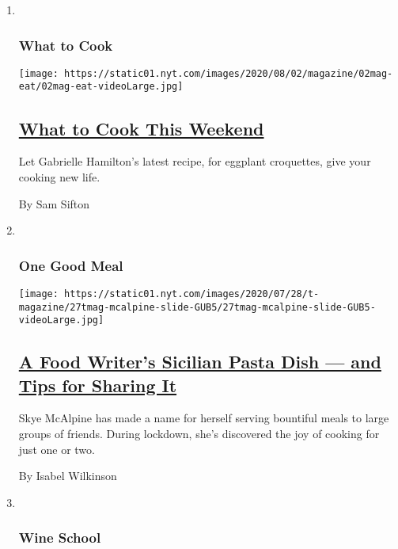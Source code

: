 \begin{enumerate}
\def\labelenumi{\arabic{enumi}.}
\item ~
  \hypertarget{what-to-cook-2}{%
  \subsubsection{What to Cook}\label{what-to-cook-2}}

  \texttt{[image: https://static01.nyt.com/images/2020/08/02/magazine/02mag-eat/02mag-eat-videoLarge.jpg]}

  \hypertarget{what-to-cook-this-weekend}{%
  \subsection{\texorpdfstring{\href{/2020/07/31/dining/what-to-cook-this-weekend.html}{What
  to Cook This
  Weekend}}{What to Cook This Weekend}}\label{what-to-cook-this-weekend}}

  Let Gabrielle Hamilton's latest recipe, for eggplant croquettes, give
  your cooking new life.

  By Sam Sifton
\item ~
  \hypertarget{one-good-meal}{%
  \subsubsection{One Good Meal}\label{one-good-meal}}

  \texttt{[image: https://static01.nyt.com/images/2020/07/28/t-magazine/27tmag-mcalpine-slide-GUB5/27tmag-mcalpine-slide-GUB5-videoLarge.jpg]}

  \hypertarget{a-food-writers-sicilian-pasta-dish--and-tips-for-sharing-it}{%
  \subsection{\texorpdfstring{\href{/2020/07/29/t-magazine/skye-mcalpine-pasta-cooking.html}{A
  Food Writer's Sicilian Pasta Dish --- and Tips for Sharing
  It}}{A Food Writer's Sicilian Pasta Dish --- and Tips for Sharing It}}\label{a-food-writers-sicilian-pasta-dish--and-tips-for-sharing-it}}

  Skye McAlpine has made a name for herself serving bountiful meals to
  large groups of friends. During lockdown, she's discovered the joy of
  cooking for just one or two.

  By Isabel Wilkinson
\item ~
  \hypertarget{wine-school}{%
  \subsubsection{Wine School}\label{wine-school}}


\end{enumerate}
